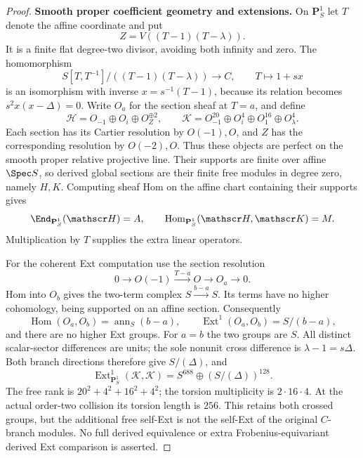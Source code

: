\begin{proof}
\par\smallskip\noindent\textbf{Smooth proper coefficient geometry and extensions.}\quad
On $\mathbf P^1_S$ let $T$ denote the affine coordinate and put
\[
 Z=V((T-1)(T-\lambda)).
\]
It is a finite flat degree-two divisor, avoiding both infinity
and zero. The homomorphism
\[
 S[T,T^{-1}]/((T-1)(T-\lambda))
       \longrightarrow C,\qquad T\longmapsto1+s x
\]
is an isomorphism with inverse $x=s^{-1}(T-1)$, because its
relation becomes $s^2x(x-\Delta)=0$.
Write $O_a$ for the section sheaf at $T=a$, and define
\[
 \mathscr H=O_{-1}\oplus O_i\oplus O_Z^{\oplus2},\qquad
 \mathscr K=O_{-1}^{20}\oplus O_i^4
       \oplus O_1^{16}\oplus O_\lambda^4.
\]
Each section has its Cartier resolution by $O(-1),O$,
and $Z$ has the corresponding resolution by $O(-2),O$.
Thus these objects are perfect on the smooth proper
relative projective line. Their supports are finite over
affine $\Spec S$, so derived global sections are their
finite free modules in degree zero, namely $H,K$.
Computing sheaf Hom on the affine chart containing their
supports gives
\[
 \End_{\mathbf P^1_S}(\mathscr H)=A,\qquad
 \operatorname{Hom}_{\mathbf P^1_S}(\mathscr H,\mathscr K)=M.
\]
Multiplication by $T$ supplies the extra linear operators.

For the coherent Ext computation use the section resolution
\[
 0\longrightarrow O(-1)\xrightarrow{T-a}O
       \longrightarrow O_a\longrightarrow0.
\]
Hom into $O_b$ gives the two-term complex
$S\xrightarrow{b-a}S$. Its terms have no higher cohomology,
being supported on an affine section. Consequently
\[
 \operatorname{Hom}(O_a,O_b)=\operatorname{ann}_S(b-a),
 \qquad
 \operatorname{Ext}^1(O_a,O_b)=S/(b-a),
\]
and there are no higher Ext groups. For $a=b$ the two
groups are $S$. All distinct scalar-sector differences
are units; the sole nonunit cross difference is
$\lambda-1=s\Delta$. Both branch directions therefore give
$S/(\Delta)$, and
\begin{equation}\label{eq:cayleyext}
 \operatorname{Ext}^1_{\mathbf P^1_S}(\mathscr K,\mathscr K)
      =S^{688}\oplus(S/(\Delta))^{128}.
\end{equation}
The free rank is $20^2+4^2+16^2+4^2$; the torsion multiplicity
is $2\cdot16\cdot4$. At the actual order-two collision its
torsion length is $256$. This retains both crossed groups,
but the additional free self-Ext is not the self-Ext of the
original $C$-branch modules. No full derived equivalence
or extra Frobenius-equivariant derived Ext comparison is
asserted.


\end{proof}
